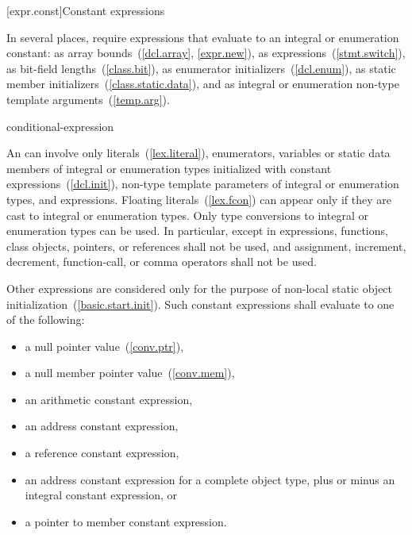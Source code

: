 [expr.const]{Constant expressions}%

\pnum
In several places, \Cpp require expressions that evaluate to an integral
or enumeration constant: as array bounds~(\ref{dcl.array}, \ref{expr.new}),
as  expressions~(\ref{stmt.switch}), as bit-field
lengths~(\ref{class.bit}), as enumerator initializers~(\ref{dcl.enum}),
as static member initializers~(\ref{class.static.data}), and as integral
or enumeration non-type template arguments~(\ref{temp.arg}).

\begin{bnf}
\br
    conditional-expression
\end{bnf}

An  can involve only
literals~(\ref{lex.literal}), enumerators,  variables or static
data members of integral or enumeration types initialized with constant
expressions~(\ref{dcl.init}), non-type template parameters of integral or
enumeration types, and  expressions. Floating
literals~(\ref{lex.fcon}) can appear only if they are cast to integral or
enumeration types. Only type conversions to integral or enumeration
types can be used. In particular, except in  expressions,
functions, class objects, pointers, or references shall not be used, and
assignment, increment, decrement, function-call, or comma operators shall
not be used.

\pnum
Other expressions are considered  only
for the purpose of non-local static object
initialization~(\ref{basic.start.init}). Such constant expressions shall
evaluate to one of the following:

\begin{itemize}
\item a null pointer value~(\ref{conv.ptr}),
\item a null member pointer value~(\ref{conv.mem}),
\item an arithmetic constant expression,
\item an address constant expression,
\item a reference constant expression,
\item an address constant expression for a complete object type, plus or
minus an integral constant expression, or
\item a pointer to member constant expression.
\end{itemize}

